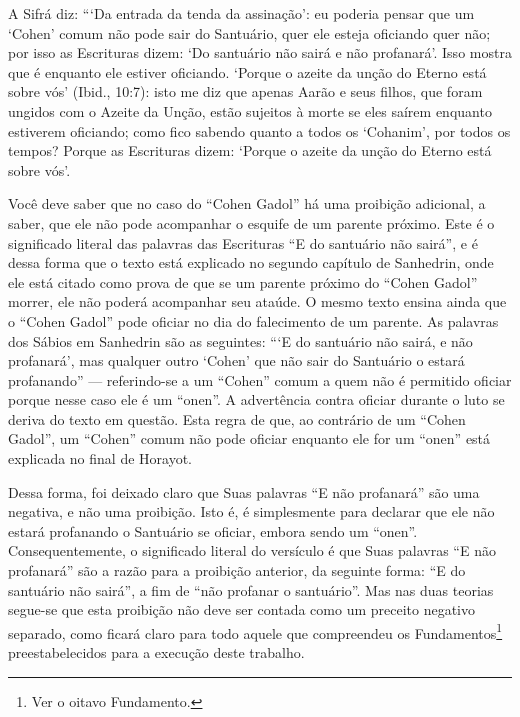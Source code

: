 A Sifrá diz: ```Da entrada da tenda da assinação': eu poderia pensar que
um `Cohen' comum não pode sair do Santuário, quer ele esteja oficiando
quer não; por isso as Escrituras dizem: `Do santuário não sairá e não
profanará'. Isso mostra que é enquanto ele estiver oficiando. `Porque o
azeite da unção do Eterno está sobre vós' (Ibid., 10:7): isto me diz que
apenas Aarão e seus filhos, que foram ungidos com o Azeite da Unção,
estão sujeitos à morte se eles saírem enquanto estiverem oficiando; como
fico sabendo quanto a todos os `Cohanim', por todos os tempos? Porque as
Escrituras dizem: `Porque o azeite da unção do Eterno está sobre
vós'.

Você deve saber que no caso do ``Cohen Gadol'' há uma proibição
adicional, a saber, que ele não pode acompanhar o esquife de um parente
próximo. Este é o significado literal das palavras das Escrituras ``E do
santuário não sairá'', e é dessa forma que o texto está explicado no
segundo capítulo de Sanhedrin, onde ele está citado como prova de que
se um parente próximo do ``Cohen Gadol'' morrer, ele não poderá
acompanhar seu ataúde. O mesmo texto ensina ainda que o ``Cohen Gadol''
pode oficiar no dia do falecimento de um parente. As palavras dos Sábios
em Sanhedrin são as seguintes: ```E do santuário não sairá, e não
profanará', mas qualquer outro `Cohen' que não sair do Santuário o
estará profanando'' --- referindo-se a um ``Cohen'' comum a quem não é
permitido oficiar porque nesse caso ele é um ``onen''. A advertência
contra oficiar durante o luto se deriva do texto em questão. Esta regra
de que, ao contrário de um ``Cohen Gadol'', um ``Cohen'' comum não pode
oficiar enquanto ele for um ``onen'' está explicada no final de
Horayot.

Dessa forma, foi deixado claro que Suas palavras ``E não profanará''
são uma negativa, e não uma proibição. Isto é, é simplesmente para
declarar que ele não estará profanando o Santuário se oficiar, embora sendo um
``onen''.
Consequentemente, o significado literal do versículo é que Suas palavras
``E não profanará'' são a razão para a proibição anterior, da seguinte
forma: ``E do santuário não sairá'', a fim de ``não profanar o santuário''.
Mas nas duas teorias segue-se que esta proibição não deve ser contada
como um preceito negativo separado, como ficará claro para todo aquele
que compreendeu os Fundamentos\footnote{Ver o oitavo Fundamento.} preestabelecidos
para a execução deste trabalho.

